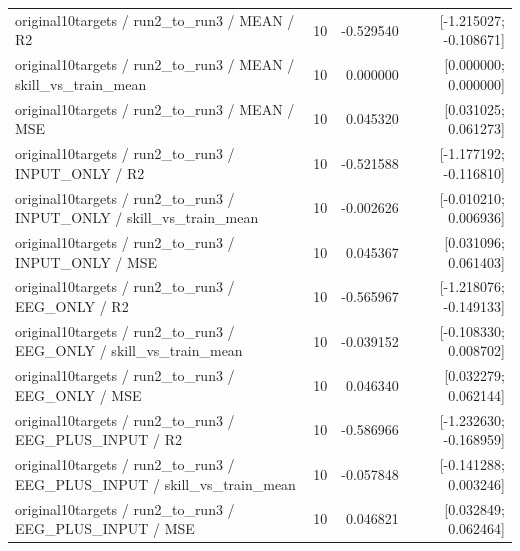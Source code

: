 \begin{longtable}{p{.56\linewidth}rrr}
original10targets / run2\_to\_run3 / MEAN / R2 & 10 & -0.529540 & [-1.215027; -0.108671] \\
original10targets / run2\_to\_run3 / MEAN / skill\_vs\_train\_mean & 10 & 0.000000 & [0.000000; 0.000000] \\
original10targets / run2\_to\_run3 / MEAN / MSE & 10 & 0.045320 & [0.031025; 0.061273] \\
original10targets / run2\_to\_run3 / INPUT\_ONLY / R2 & 10 & -0.521588 & [-1.177192; -0.116810] \\
original10targets / run2\_to\_run3 / INPUT\_ONLY / skill\_vs\_train\_mean & 10 & -0.002626 & [-0.010210; 0.006936] \\
original10targets / run2\_to\_run3 / INPUT\_ONLY / MSE & 10 & 0.045367 & [0.031096; 0.061403] \\
original10targets / run2\_to\_run3 / EEG\_ONLY / R2 & 10 & -0.565967 & [-1.218076; -0.149133] \\
original10targets / run2\_to\_run3 / EEG\_ONLY / skill\_vs\_train\_mean & 10 & -0.039152 & [-0.108330; 0.008702] \\
original10targets / run2\_to\_run3 / EEG\_ONLY / MSE & 10 & 0.046340 & [0.032279; 0.062144] \\
original10targets / run2\_to\_run3 / EEG\_PLUS\_INPUT / R2 & 10 & -0.586966 & [-1.232630; -0.168959] \\
original10targets / run2\_to\_run3 / EEG\_PLUS\_INPUT / skill\_vs\_train\_mean & 10 & -0.057848 & [-0.141288; 0.003246] \\
original10targets / run2\_to\_run3 / EEG\_PLUS\_INPUT / MSE & 10 & 0.046821 & [0.032849; 0.062464] \\
\bottomrule\end{longtable}

